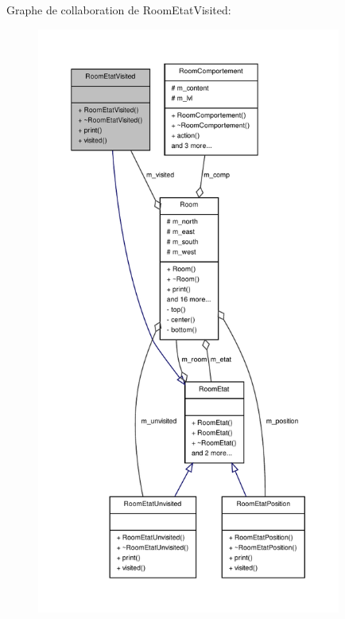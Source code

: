 Graphe de collaboration de Room\-Etat\-Visited\-:
\nopagebreak
\begin{figure}[H]
\begin{center}
\leavevmode
\includegraphics[height=550pt]{class_room_etat_visited__coll__graph}
\end{center}
\end{figure}
